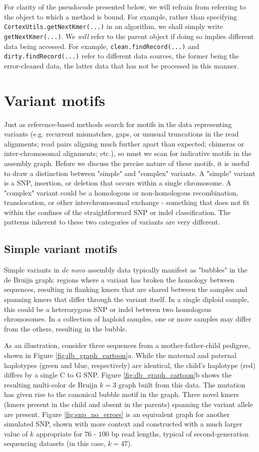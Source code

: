 For clarity of the pseudocode presented below, we will refrain from referring to the object to which a method is bound.  For example, rather than specifying \texttt{CortexUtils.getNextKmer(...)} in an algorithm, we shall simply write \texttt{getNextKmer(...)}.  We \textit{will} refer to the parent object if doing so implies different data being accessed.  For example, \texttt{clean.findRecord(...)} and \texttt{dirty.findRecord(...)} refer to different data sources, the former being the error-cleaned data, the latter data that has not be processed in this manner.

\section{Variant motifs}
Just as reference-based methods search for motifs in the data representing variants (e.g. recurrent mismatches, gaps, or unusual truncations in the read alignments; read pairs aligning much further apart than expected; chimeras or inter-chromosomal alignments; etc.), so must we scan for indicative motifs in the assembly graph.  Before we discuss the precise nature of these motifs, it is useful to draw a distinction between "simple" and "complex" variants.  A "simple" variant is a SNP, insertion, or deletion that occurs within a single chromosome.  A "complex" variant could be a homologous or non-homologous recombination, translocation, or other interchromosomal exchange - something that does not fit within the confines of the straightforward SNP or indel classification.  The patterns inherent to these two categories of variants are very different.

\subsection{Simple variant motifs}
Simple variants in \textit{de novo} assembly data typically manifest as "bubbles" in the de Bruijn graph: regions where a variant has broken the homology between sequences, resulting in flanking kmers that are shared between the samples and spanning kmers that differ through the variant itself.  In a single diploid sample, this could be a heterozygous SNP or indel between two homologous chromosomes.  In a collection of haploid samples, one or more samples may differ from the others, resulting in the bubble.

As an illustration, consider three sequences from a mother-father-child pedigree, shown in Figure \ref{fig:db_graph_cartoon}a.  While the maternal and paternal haplotypes (green and blue, respectively) are identical, the child's haplotype (red) differs by a single C to G SNP.  Figure \ref{fig:db_graph_cartoon}b shows the resulting multi-color de Bruijn $k=3$ graph built from this data.  The mutation has given rise to the canonical bubble motif in the graph.  Three novel kmers (kmers present in the child and absent in the parents) spanning the variant allele are present.  Figure \ref{fig:snp_no_errors} is an equivalent graph for another simulated SNP, shown with more context and constructed with a much larger value of $k$ appropriate for $76$ - $100$ bp read lengths, typical of second-generation sequencing datasets (in this case, $k=47$).

